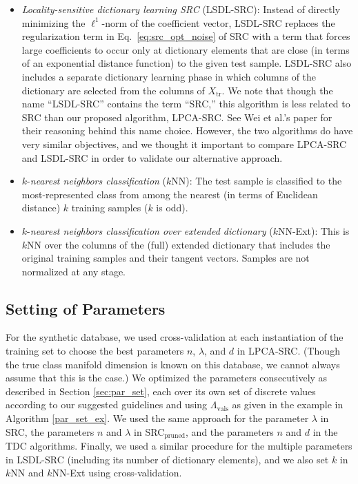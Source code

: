 \documentclass[review]{elsarticle}
\begin{document}
\begin{itemize}[noitemsep,nolistsep]
\item \textit{Locality-sensitive dictionary learning SRC} (LSDL-SRC): Instead of directly minimizing the $\ell^1$-norm of the coefficient vector, LSDL-SRC replaces the regularization term in Eq.~\eqref{eq:src_opt_noise} of SRC with a term that forces large coefficients to occur only at dictionary elements that are close (in terms of an exponential distance function) to the given test sample. LSDL-SRC also includes a separate dictionary learning phase in which columns of the dictionary are selected from the columns of $X_\mathrm{tr}$. We note that though the name ``LSDL-SRC'' contains the term ``SRC,'' this algorithm is less related to SRC than our proposed algorithm, LPCA-SRC. See Wei et al.'s paper \cite{wei:lsdl} for their reasoning behind this name choice. However, the two algorithms do have very similar objectives, and we thought it important to compare LPCA-SRC and LSDL-SRC in order to validate our alternative approach.


\item $\mathit{k}$-\textit{nearest neighbors classification} ($k$NN): The test sample is classified to the most-represented class from among the nearest (in terms of Euclidean distance) $k$ training samples ($k$ is odd).

\item $\mathit{k}$-\textit{nearest neighbors classification over extended dictionary} ($k$NN-Ext): This is $k$NN over the columns of the (full) extended dictionary that includes the original training samples and their tangent vectors. Samples are not normalized at any stage. 

\end{itemize}



\subsection{Setting of Parameters}

For the synthetic database, we used cross-validation at each instantiation of the training set to choose the best parameters $n$, $\lambda$, and $d$ in LPCA-SRC. (Though the true class manifold dimension is known on this database, we cannot always assume that this is the case.) We optimized the parameters consecutively as described in Section \ref{sec:par_set}, each over its own set of discrete values according to our suggested guidelines and using $\Lambda_\mathrm{vals}$ as given in the example in Algorithm \ref{par_set_ex}. We used the same approach for the parameter $\lambda$ in SRC, the parameters $n$ and $\lambda$ in SRC$_\mathrm{pruned}$, and the parameters $n$ and $d$ in the TDC algorithms. Finally, we used a similar procedure for the multiple parameters in LSDL-SRC (including its number of dictionary elements), and we also set $k$ in $k$NN and $k$NN-Ext using cross-validation. 
\end{document}
